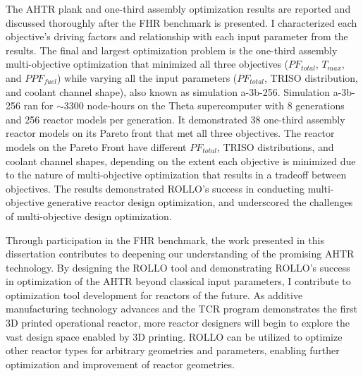 The \gls{AHTR} plank and one-third assembly optimization results are reported and 
discussed thoroughly after the \gls{FHR} benchmark is presented. 
I characterized each objective's driving factors and relationship with each input 
parameter from the results. 
The final and largest optimization problem is the one-third assembly multi-objective 
optimization that minimized all three objectives ($PF_{total}$, $T_{max}$, and 
$PPF_{fuel}$) while varying all the input parameters ($PF_{total}$, TRISO distribution, 
and coolant channel shape), also known as simulation a-3b-256. 
Simulation a-3b-256 ran for $\sim 3300$ node-hours on the Theta supercomputer with 
8 generations and 256 reactor models per generation. 
It demonstrated 38 one-third assembly reactor models on its Pareto front that met all 
three objectives. 
The reactor models on the Pareto Front have different $PF_{total}$, TRISO distributions, 
and coolant channel shapes, depending on the extent each objective is minimized due 
to the nature of multi-objective optimization that results in a tradeoff between 
objectives. 
The results demonstrated \gls{ROLLO}'s success in conducting multi-objective generative 
reactor design optimization, and underscored the challenges of multi-objective 
design optimization. 

Through participation in the \gls{FHR} benchmark, the work presented in this 
dissertation contributes to deepening our understanding of the promising 
\gls{AHTR} technology. 
By designing the \gls{ROLLO} tool and demonstrating \gls{ROLLO}'s success in 
optimization of the \gls{AHTR} beyond classical input parameters, I contribute to 
optimization tool development for reactors of the future. 
As additive manufacturing technology advances and the \gls{TCR} program 
demonstrates the first 3D printed operational reactor, more reactor designers 
will begin to explore the vast design space enabled by 3D printing. 
\gls{ROLLO} can be utilized to optimize other reactor types for arbitrary
geometries and parameters, enabling further optimization and improvement of reactor 
geometries.